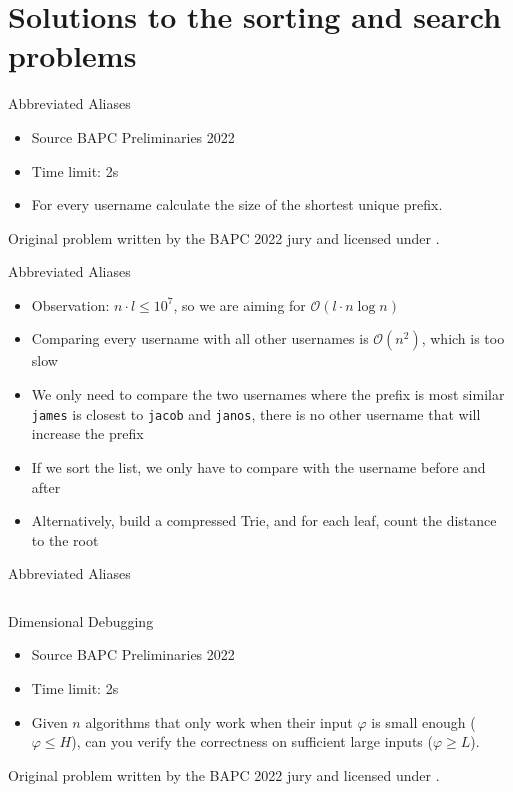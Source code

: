 \documentclass[11pt,pdf, aspectratio=169]{beamer}
\begin{document}
  \section{Solutions to the sorting and search problems}
  \begin{frame}{Abbreviated Aliases}
    \begin{itemize}
      \item Source BAPC Preliminaries 2022
      \item Time limit: 2s
      \item For every username calculate the size of the shortest unique prefix.
    \end{itemize}
    Original problem written by the BAPC 2022 jury and licensed under \doclicenseLongNameRef.

    \doclicenseImage
  \end{frame}

  \begin{frame}{Abbreviated Aliases}
    \begin{itemize}
      \item Observation: $n\cdot l \leq 10^7$, so we are aiming for $\mathcal{O}(l \cdot n\log{}n)$
      \item Comparing every username with all other usernames is $\mathcal{O}(n^2)$, which is too slow
      \item We only need to compare the two usernames where the prefix is most similar\\
      \texttt{james} is closest to \texttt{jacob} and \texttt{janos}, there is no other username that will increase the prefix
      \item If we sort the list, we only have to compare with the username before and after
      \item Alternatively, build a compressed Trie, and for each leaf, count the distance to the root
    \end{itemize}
  \end{frame}
  \begin{frame}[containsverbatim]{Abbreviated Aliases}
    \inputminted{python}{code/session-1/python/dapc-a.py}
  \end{frame}

  \begin{frame}{Dimensional Debugging}
    \begin{itemize}
      \item Source BAPC Preliminaries 2022
      \item Time limit: 2s
      \item Given $n$ algorithms that only work when their input $\varphi$ is small enough ($\varphi \leq H$), can you verify the correctness on sufficient large inputs ($\varphi \geq L$).
    \end{itemize}
    Original problem written by the BAPC 2022 jury and licensed under \doclicenseLongNameRef.

    \doclicenseImage
  \end{frame}
\end{document}
